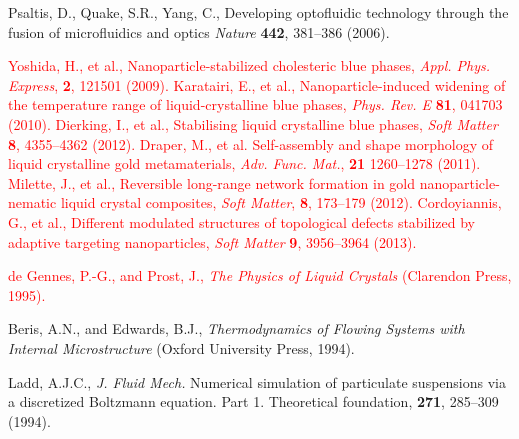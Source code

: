 \documentclass[12pt]{article}
\begin{document}
\begin{thebibliography}{99}
 Psaltis, D., Quake, S.R., Yang, C.,
Developing optofluidic technology through the fusion of microfluidics and
optics {\it Nature} {\bf 442}, 381--386 (2006).

\textcolor{red}{
Yoshida, H., et al.,
Nanoparticle-stabilized cholesteric blue phases,
\textit{Appl. Phys. Express}, \textbf{2}, 121501 (2009).
%
 Karatairi, E., et al.,
Nanoparticle-induced widening of the temperature range of
liquid-crystalline blue phases, 
\textit{Phys. Rev. E} \textbf{81}, 041703 (2010).
%
%
Dierking, I., et al.,
Stabilising liquid crystalline blue phases,
\textit{Soft Matter} \textbf{8}, 4355--4362 (2012).
%
Draper, M., et al.
Self-assembly and shape morphology of liquid crystalline gold metamaterials,
\textit{Adv. Func. Mat.}, \textbf{21} 1260--1278 (2011).
%
Milette, J., et al.,
Reversible long-range network formation in gold nanoparticle-nematic
liquid crystal composites,
\textit{Soft Matter}, \textbf{8}, 173--179 (2012).
%
 Cordoyiannis, G., et al.,
Different modulated structures of topological defects stabilized by adaptive
targeting nanoparticles,
\textit{Soft Matter} \textbf{9}, 3956--3964 (2013).
}


\textcolor{red}{de Gennes, P.-G., and  Prost, J.,
{\it The Physics of Liquid Crystals} (Clarendon Press, 1995).}

Beris, A.N., and  Edwards, B.J., 
{\it Thermodynamics of Flowing Systems with Internal Microstructure}
(Oxford University Press, 1994).

Ladd, A.J.C.,
\textit{J. Fluid Mech.} Numerical simulation of particulate suspensions via a
discretized Boltzmann equation. Part 1. Theoretical foundation,
\textbf{271}, 285--309 (1994).


\end{thebibliography}
\end{document}
